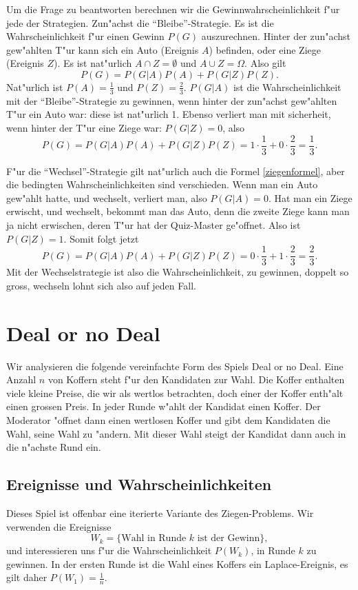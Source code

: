Um die Frage zu beantworten berechnen wir die Gewinnwahrscheinlichkeit 
f"ur jede der Strategien. Zun"achst die ``Bleibe''-Strategie. Es ist die
Wahrscheinlichkeit f"ur einen Gewinn $P(G)$ auszurechnen. Hinter der zun"achst
gew"ahlten T"ur kann sich ein Auto (Ereignis $A$) befinden, oder eine Ziege
(Ereignis $Z$). Es ist nat"urlich $A\cap Z=\emptyset$ und $A\cup Z=\Omega$.
Also gilt
\begin{equation}
P(G)=P(G|A) P(A) + P(G|Z)P(Z).
\label{ziegenformel}
\end{equation}
Nat"urlich ist $P(A)=\frac13$ und $P(Z)=\frac23$.
$P(G|A)$ ist die Wahrscheinlichkeit mit der ``Bleibe''-Strategie zu
gewinnen, wenn hinter der zun"achst gew"ahlten T"ur ein Auto war: diese
ist nat"urlich 1. Ebenso verliert man mit sicherheit, wenn hinter der
T"ur eine Ziege war: $P(G|Z)=0$, also
\[
P(G)=P(G|A)P(A)+P(G|Z)P(Z)=1\cdot \frac13 + 0\cdot\frac 23=\frac13.
\]

F"ur die ``Wechsel''-Strategie gilt nat"urlich auch die Formel
\ref{ziegenformel}, aber die bedingten Wahrscheinlichkeiten sind verschieden.
Wenn man ein Auto gew"ahlt hatte, und wechselt, verliert man, also $P(G|A)=0$.
Hat man ein Ziege erwischt, und wechselt, bekommt man das Auto, denn die
zweite Ziege kann man ja nicht erwischen, deren T"ur hat der Quiz-Master
ge"offnet. Also ist $P(G|Z)=1$. Somit folgt jetzt
\[
P(G)=P(G|A)P(A)+P(G|Z)P(Z)=0\cdot\frac13+1\cdot\frac23=\frac23.
\]
Mit der Wechselstrategie ist also die Wahrscheinlichkeit, zu gewinnen,
doppelt so gross, wechseln lohnt sich also auf jeden Fall.

\section{Deal or no Deal}
Wir analysieren die folgende vereinfachte Form des Spiels Deal or no Deal.
Eine Anzahl $n$ von Koffern steht f"ur den Kandidaten zur Wahl.
Die Koffer enthalten viele kleine Preise, die wir als wertlos betrachten,
doch einer der Koffer enth"alt einen grossen Preis.
In jeder Runde w"ahlt der Kandidat einen Koffer. Der Moderator "offnet
dann einen wertlosen Koffer und gibt dem Kandidaten die Wahl, seine Wahl
zu "andern.
Mit dieser Wahl steigt der Kandidat dann auch in die n"achste Rund ein.

\subsection{Ereignisse und Wahrscheinlichkeiten}
Dieses Spiel ist offenbar eine iterierte Variante des Ziegen-Problems.
Wir verwenden die Ereignisse 
\[
W_k=\{\text{Wahl in Runde $k$ ist der Gewinn}\},
\]
und interessieren uns f"ur die Wahrscheinlichkeit $P(W_k)$, in Runde
$k$ zu gewinnen.
In der ersten Runde ist die Wahl eines Koffers ein Laplace-Ereignis,
es gilt daher $P(W_1)=\frac1n$.

